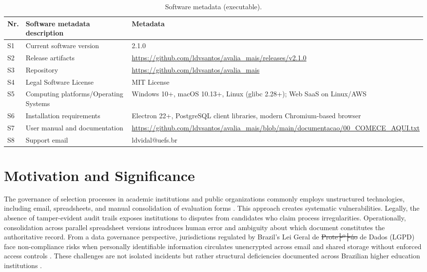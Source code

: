 \documentclass[preprint,12pt,a4paper]{elsarticle}
\makeatletter
\providecommand{\DIFaddtex}[1]{{\protect\color{blue}\uwave{#1}}} %
\providecommand{\DIFdeltex}[1]{{\protect\color{red}\sout{#1}}} %
\providecommand{\DIFaddbegin}{} %
\providecommand{\DIFaddend}{} %
\providecommand{\DIFdelbegin}{} %
\providecommand{\DIFdelend}{} %
\providecommand{\DIFadd}[1]{\texorpdfstring{\DIFaddtex{#1}}{#1}} %
\providecommand{\DIFdel}[1]{\texorpdfstring{\DIFdeltex{#1}}{}} %
\providecommand{\DIFscaledelfig}{0.5}
\newlength{\DIFdelgraphicswidth} %
\newlength{\DIFdelgraphicsheight} %
\providecommand{\DIFaddincludegraphics}[2][]{{\color{blue}\fbox{\DIFOincludegraphics[#1]{#2}}}} %
\providecommand{\DIFdelincludegraphics}[2][]{%
\sbox{\DIFdelgraphicsbox}{\DIFOincludegraphics[#1]{#2}}%
\settoboxwidth{\DIFdelgraphicswidth}{\DIFdelgraphicsbox} %
\settoboxtotalheight{\DIFdelgraphicsheight}{\DIFdelgraphicsbox} %
\scalebox{\DIFscaledelfig}{%
\parbox[b]{\DIFdelgraphicswidth}{\usebox{\DIFdelgraphicsbox}\\[-\baselineskip] \rule{\DIFdelgraphicswidth}{0em}}\llap{\resizebox{\DIFdelgraphicswidth}{\DIFdelgraphicsheight}{%
\setlength{\unitlength}{\DIFdelgraphicswidth}%
\begin{picture}(1,1)%
\thicklines\linethickness{2pt} %
{\color[rgb]{1,0,0}\put(0,0){\framebox(1,1){}}}%
{\color[rgb]{1,0,0}\put(0,0){\line( 1,1){1}}}%
{\color[rgb]{1,0,0}\put(0,1){\line(1,-1){1}}}%
\end{picture}%
}\hspace*{3pt}}} %
} %
\DeclareRobustCommand{\DIFaddbegin}{\DIFOaddbegin \let\includegraphics\DIFaddincludegraphics} %
\DeclareRobustCommand{\DIFaddend}{\DIFOaddend \let\includegraphics\DIFOincludegraphics} %
\DeclareRobustCommand{\DIFdelbegin}{\DIFOdelbegin \let\includegraphics\DIFdelincludegraphics} %
\DeclareRobustCommand{\DIFdelend}{\DIFOaddend \let\includegraphics\DIFOincludegraphics} %
\let\sout@orig\sout %
\renewcommand{\sout}[1]{\ifmmode\text{\sout@orig{\ensuremath{#1}}}\else\sout@orig{#1}\fi} %
\makeatother
\begin{document}
\begin{table}[!h]
\begin{tabular}{|l|p{6.5cm}|p{6.5cm}|}
\hline
\textbf{Nr.} & \textbf{Software metadata description} & \textbf{Metadata} \\
\hline
S1 & Current software version & 2.1.0 \\
\hline
S2 & Release artifacts & \url{https://github.com/ldvsantos/avalia_mais/releases/v2.1.0} \\
\hline
S3 & Repository & \url{https://github.com/ldvsantos/avalia_mais} \\
\hline
S4 & Legal Software License & MIT License \\
\hline
S5 & Computing platforms/Operating Systems & Windows 10+, macOS 10.13+, Linux (glibc 2.28+); Web SaaS on Linux/AWS \\
\hline
S6 & Installation requirements & Electron 22+, PostgreSQL client libraries, modern Chromium-based browser \\
\hline
S7 & User manual and documentation & \url{https://github.com/ldvsantos/avalia_mais/blob/main/documentacao/00_COMECE_AQUI.txt} \\
\hline
S8 & Support email & ldvidal@uefs.br \\
\hline
\end{tabular}
\caption{Software metadata (executable).}
\label{executableMetadata}
\end{table}

\section{Motivation and Significance}

The governance of selection processes in academic institutions and public organizations commonly employs unstructured technologies, including email, spreadsheets, and manual consolidation of evaluation forms \citep{Khan2021,Esposito2016}. This approach creates systematic vulnerabilities. Legally, the absence of tamper-evident audit trails exposes institutions to disputes from candidates who claim process irregularities. Operationally, consolidation across parallel spreadsheet versions introduces human error and ambiguity about which document constitutes the authoritative record. From a data governance perspective, jurisdictions regulated by Brazil's Lei Geral de \DIFdelbegin \DIFdel{Prote├º├úo }\DIFdelend \DIFaddbegin \DIFadd{Proteção }\DIFaddend de Dados (LGPD) \citep{LGPD2018} face non-compliance risks when personally identifiable information circulates unencrypted across email and shared storage without enforced access controls \citep{Cavoukian2011}. These challenges are not isolated incidents but rather structural deficiencies documented across Brazilian higher education institutions \citep{Machado2018}.
\end{document}
